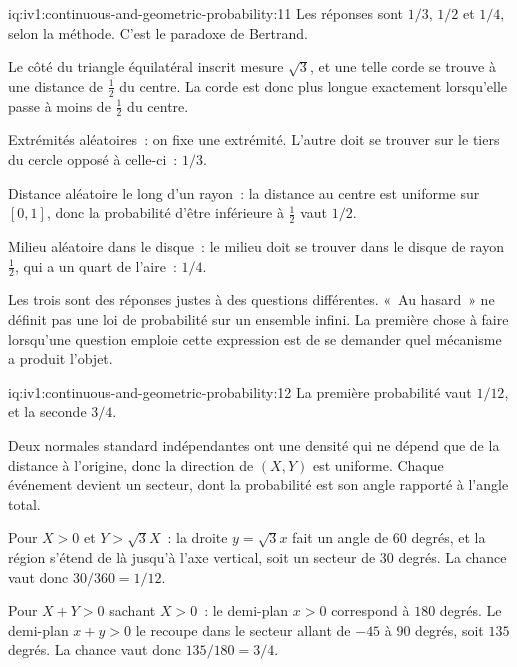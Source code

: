\begin{solution}{iq:iv1:continuous-and-geometric-probability:11}
Les réponses sont $1/3$, $1/2$ et $1/4$, selon la méthode. C'est le paradoxe de Bertrand.

Le côté du triangle équilatéral inscrit mesure $\sqrt{3}$, et une telle corde se trouve à une distance de $\tfrac12$ du centre. La corde est donc plus longue exactement lorsqu'elle passe à moins de $\tfrac12$ du centre.

Extrémités aléatoires~: on fixe une extrémité. L'autre doit se trouver sur le tiers du cercle opposé à celle-ci~: $1/3$.

Distance aléatoire le long d'un rayon~: la distance au centre est uniforme sur $[0, 1]$, donc la probabilité d'être inférieure à $\tfrac12$ vaut $1/2$.

Milieu aléatoire dans le disque~: le milieu doit se trouver dans le disque de rayon $\tfrac12$, qui a un quart de l'aire~: $1/4$.

Les trois sont des réponses justes à des questions différentes. «~Au hasard~» ne définit pas une loi de probabilité sur un ensemble infini. La première chose à faire lorsqu'une question emploie cette expression est de se demander quel mécanisme a produit l'objet.

\end{solution}

\begin{solution}{iq:iv1:continuous-and-geometric-probability:12}
La première probabilité vaut $1/12$, et la seconde $3/4$.

Deux normales standard indépendantes ont une densité qui ne dépend que de la distance à l'origine, donc la direction de $(X, Y)$ est uniforme. Chaque événement devient un secteur, dont la probabilité est son angle rapporté à l'angle total.

Pour $X > 0$ et $Y > \sqrt{3}X$~: la droite $y = \sqrt{3}x$ fait un angle de $60$ degrés, et la région s'étend de là jusqu'à l'axe vertical, soit un secteur de $30$ degrés. La chance vaut donc $30/360 = 1/12$.

Pour $X + Y > 0$ sachant $X > 0$~: le demi-plan $x > 0$ correspond à $180$ degrés. Le demi-plan $x + y > 0$ le recoupe dans le secteur allant de $-45$ à $90$ degrés, soit $135$ degrés. La chance vaut donc $135/180 = 3/4$.

\end{solution}

